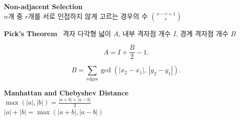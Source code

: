 \vspace{5pt}
\noindent \textbf{Non-adjacent Selection} \\
$n$개 중 $r$개를 서로 인접하지 않게 고르는 경우의 수 $\displaystyle \binom{n-r+1}{r}$

\vspace{5pt}
\noindent \textbf{Pick's Theorem} \
격자 다각형 넓이 $A$, 내부 격자점 개수 $I$, 경계 격자점 개수 $B$

$$
A = I + \frac{B}{2} - 1.
$$

$$
B = \sum_{\text{edges}} \gcd\left(|x_2-x_1|,\ |y_2-y_1|\right).
$$

\vspace{5pt}
\noindent \textbf{Manhattan and Chebyshev Distance} \\
$\displaystyle \max(|a|, |b|) = \frac{|a+b| + |a-b|}{2}$ \\
$\displaystyle |a| + |b| = \max(|a+b|, |a-b|)$
